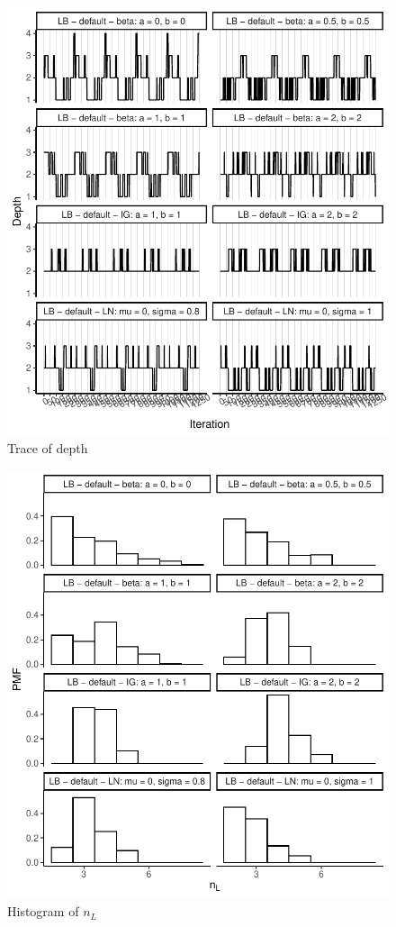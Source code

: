 \documentclass{amsart}
\begin{document}
\begin{figure}[ht]
	\centering
	\includegraphics[width=0.95\linewidth]{trace_depth_4.pdf}
	\caption{Trace of depth}
	\label{fig:trace:depth:4}
\end{figure}

\begin{figure}[ht]
	\centering
	\includegraphics[width=0.95\linewidth]{hist_nl_4.pdf}
	\caption{Histogram of $n_L$}
	\label{fig:hist:nl:4}
\end{figure}
\end{document}

